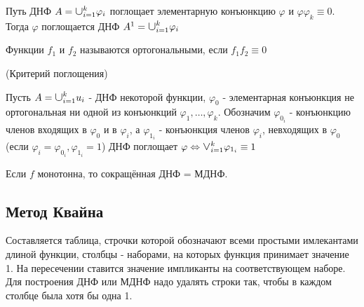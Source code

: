 \lem Путь ДНФ $A = \mathlarger{\mathlarger{\cup}} _{i=1}^k\varphi_i$ поглощает элементарную конъюнкцию $\varphi$ и $\varphi \varphi_k \equiv 0$.
Тогда $\varphi$ поглощается ДНФ $A^1=\mathlarger{\mathlarger{\cup}} _{i=1}^k\varphi_i$

\opr Функции $f_1$ и $f_2$ называются ортогональными, если $f_1f_2 \equiv 0$

\thr(Критерий поглощения)

Пусть  $A=\mathlarger{\mathlarger{\cup}} _{i=1}^k u_i$ - ДНФ некоторой функции, $\varphi_0$ - элементарная конъюнкция не ортогональная ни одной из конъюнкций $\varphi_1, \dotsc,\varphi_k$. Обозначим $\varphi_{0_i}$ - конъюнкцию членов входящих в $\varphi_0$  и в $\varphi_i$, а $\varphi_{1_i}$ - конъюнкция членов $\varphi_i$, невходящих в $\varphi_0$ (если $\varphi_i = \varphi_{0_i}, \varphi_{1_i} = 1$) ДНФ поглощает $\varphi \Leftrightarrow \mathlarger{\mathlarger{\vee}} _{i=1}^k\varphi_{1_i} \equiv 1$

\utv Если $f$ монотонна, то сокращённая ДНФ = МДНФ.

\subsection {Метод Квайна}
Составляется таблица, строчки которой обозначают всеми простыми имлекантами длиной функции, столбцы - наборами, на которых функция принимает значение 1. На пересечении ставится значение импликанты на соответствующем наборе. Для построения ДНФ или МДНФ надо удалять строки так, чтобы в каждом столбце была хотя бы одна 1.
